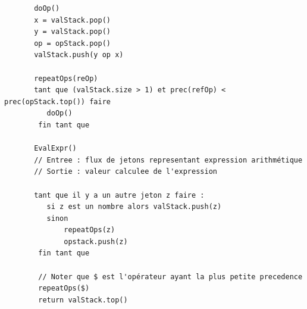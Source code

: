 \documentclass{report}
\begin{document}
    \begin{lstlisting}
       doOp() 
       x = valStack.pop() 
       y = valStack.pop() 
       op = opStack.pop() 
       valStack.push(y op x)

       repeatOps(reOp) 
       tant que (valStack.size > 1) et prec(refOp) < prec(opStack.top()) faire 
          doOp()
        fin tant que 

       EvalExpr() 
       // Entree : flux de jetons representant expression arithmétique
       // Sortie : valeur calculee de l'expression 

       tant que il y a un autre jeton z faire :
          si z est un nombre alors valStack.push(z)
          sinon 
              repeatOps(z)
              opstack.push(z)
        fin tant que

        // Noter que $ est l'opérateur ayant la plus petite precedence 
        repeatOps($) 
        return valStack.top()
    \end{lstlisting}
\end{document}
